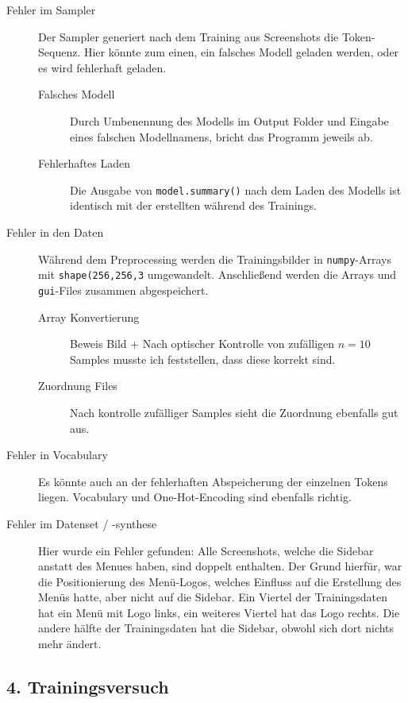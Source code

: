 \documentclass[pdftex,a4paper,halfparskip]{scrartcl}
\begin{document}
\begin{description}
	\item[Fehler im Sampler] Der Sampler generiert nach dem Training aus Screenshots die Token-Sequenz. Hier könnte zum einen, ein falsches Modell geladen werden, oder es wird fehlerhaft geladen.
	
	\begin{description}
		\item[Falsches Modell] Durch Umbenennung des Modells im Output Folder und Eingabe eines falschen Modellnamens, bricht das Programm jeweils ab.
		\item[Fehlerhaftes Laden] Die Ausgabe von \texttt{model.summary()} nach dem Laden des Modells ist identisch mit der erstellten während des Trainings.
	\end{description}
	
	\item[Fehler in den Daten] Während dem Preprocessing werden die Trainingsbilder in \texttt{numpy}-Arrays mit \texttt{shape(256,256,3} umgewandelt. Anschließend werden die Arrays und \texttt{gui}-Files zusammen abgespeichert.
	
	\begin{description}
		\item[Array Konvertierung] Beweis Bild + Nach optischer Kontrolle von zufälligen $n=10$ Samples musste ich feststellen, dass diese korrekt sind.
		\item[Zuordnung Files] Nach kontrolle zufälliger Samples sieht die Zuordnung ebenfalls gut aus.
	\end{description}
	
	\item[Fehler in Vocabulary] Es könnte auch an der fehlerhaften Abspeicherung der einzelnen Tokens liegen. Vocabulary und One-Hot-Encoding sind ebenfalls richtig.
	\item[Fehler im Datenset / -synthese] Hier wurde ein Fehler gefunden: Alle Screenshots, welche die Sidebar anstatt des Menues haben, sind doppelt enthalten. Der Grund hierfür, war die Positionierung des Menü-Logos, welches Einfluss auf die Erstellung des Menüs hatte, aber nicht auf die Sidebar. Ein Viertel der Trainingsdaten hat ein Menü mit Logo links, ein weiteres Viertel hat das Logo rechts. Die andere hälfte der Trainingsdaten hat die Sidebar, obwohl sich dort nichts mehr ändert. 
\end{description}

\subsection{4. Trainingsversuch}
\end{document}
